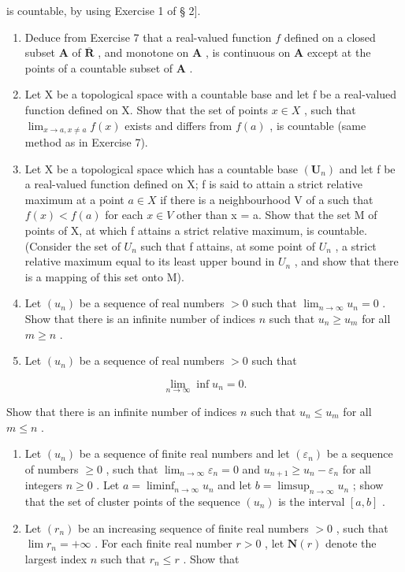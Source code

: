 is countable, by using Exercise 1 of § 2{]}.

\begin{enumerate}
\def\labelenumi{\arabic{enumi})}
\setcounter{enumi}{7}
\item
  Deduce from Exercise 7 that a real-valued function \(f\) defined on a closed subset \(\mathbf{A}\) of \(\overline{\mathbf{R}}\) , and monotone on \(\mathbf{A}\) , is continuous on \(\mathbf{A}\) except at the points of a countable subset of \(\mathbf{A}\) .
\item
  Let X be a topological space with a countable base and let f be a real-valued function defined on X. Show that the set of points \(x \in X\) , such that \(\lim_{x \to a, x \neq a} f(x)\) exists and differs from \(f(a)\) , is countable (same method as in Exercise 7).
\item
  Let X be a topological space which has a countable base \((\mathbf{U}_{n})\) and let f be a real-valued function defined on X; f is said to attain a strict relative maximum at a point \(a \in X\) if there is a neighbourhood V of a such that \(f(x) < f(a)\) for each \(x \in V\) other than x = a. Show that the set M of points of X, at which f attains a strict relative maximum, is countable. (Consider the set of \(U_{n}\) such that f attains, at some point of \(U_{n}\) , a strict relative maximum equal to its least upper bound in \(U_{n}\) , and show that there is a mapping of this set onto M).
\item
  Let \((u_n)\) be a sequence of real numbers \(>0\) such that \(\lim_{n\to \infty}u_n = 0\) . Show that there is an infinite number of indices \(n\) such that \(u_{n}\geqslant u_{m}\) for all \(m\geqslant n\) .
\item
  Let \((u_n)\) be a sequence of real numbers \(>0\) such that
\end{enumerate}

\[
\lim _ {n \to \infty} \inf u _ {n} = 0.
\]

Show that there is an infinite number of indices \(n\) such that \(u_{n} \leqslant u_{m}\) for all \(m \leqslant n\) .

\begin{enumerate}
\def\labelenumi{\arabic{enumi})}
\setcounter{enumi}{12}
\item
  Let \((u_{n})\) be a sequence of finite real numbers and let \((\varepsilon_{n})\) be a sequence of numbers \(\geqslant 0\) , such that \(\lim_{n\to \infty}\varepsilon_n = 0\) and \(u_{n + 1}\geqslant u_n - \varepsilon_n\) for all integers \(n\geqslant 0\) . Let \(a = \liminf_{n\to \infty}u_n\) and let \(b = \limsup_{n\to \infty}u_n\) ; show that the set of cluster points of the sequence \((u_{n})\) is the interval \([a,b]\) .
\item
  Let \((r_n)\) be an increasing sequence of finite real numbers \(>0\) , such that \(\lim r_n = +\infty\) . For each finite real number \(r > 0\) , let \(\mathbf{N}(r)\) denote the largest index \(n\) such that \(r_n \leqslant r\) . Show that
\end{enumerate}

